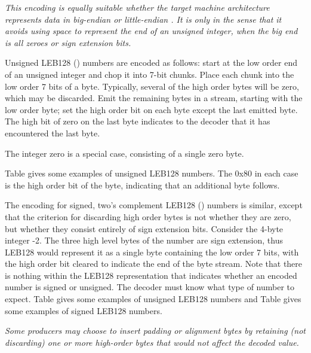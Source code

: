 \textit{This encoding is equally suitable whether the target machine
architecture represents data in big-endian or little-endian
\byteorder. It is  only in the sense that it
avoids using space to represent the  end of an
unsigned integer, when the big end is all zeroes or sign
extension bits.}

Unsigned LEB128 () 
numbers are encoded as follows:
start at the low order end of an unsigned integer and chop
it into 7-bit chunks. Place each chunk into the low order 7
bits of a byte. Typically, several of the high order bytes
will be 
\bb
zero, which may be discarded. 
\eb
Emit the remaining bytes in a
stream, starting with the low order byte; set the high order
bit on each byte except the last emitted byte. The high bit
of zero on the last byte indicates to the decoder that it
has encountered the last byte.

The integer zero is a special case, consisting of a single
zero byte.

Table 
gives some examples of unsigned LEB128
numbers. The
0x80 in each case is the high order bit of the byte, indicating
that an additional byte follows.


The encoding for signed, two\textquoteright{s} complement LEB128 
() 
numbers is similar, except that the criterion for discarding
high order bytes is not whether they are zero, but whether
they consist entirely of sign extension bits. Consider the
4-byte integer -2. The three high level bytes of the number
are sign extension, thus LEB128 would represent it as a single
byte containing the low order 7 bits, with the high order
bit cleared to indicate the end of the byte stream. Note
that there is nothing within the LEB128 representation that
indicates whether an encoded number is signed or unsigned. The
decoder must know what type of number to expect. 
Table 
gives some examples of unsigned LEB128
numbers and Table 
gives some examples of signed LEB128 
numbers.

\textit{Some 
\bb
producers may choose to insert padding or alignment bytes by 
retaining (not discarding) one or more high-order bytes that would 
not affect the decoded value.}
\eb

